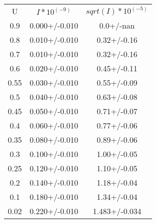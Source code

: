 \begin{table}
\begin{tabular}{ccc}
U & $I*10^(-9)$ & $sqrt(I)*10^(-5)$ \\
0.9 & 0.000+/-0.010 & 0.0+/-nan \\
0.8 & 0.010+/-0.010 & 0.32+/-0.16 \\
0.7 & 0.010+/-0.010 & 0.32+/-0.16 \\
0.6 & 0.020+/-0.010 & 0.45+/-0.11 \\
0.55 & 0.030+/-0.010 & 0.55+/-0.09 \\
0.5 & 0.040+/-0.010 & 0.63+/-0.08 \\
0.45 & 0.050+/-0.010 & 0.71+/-0.07 \\
0.4 & 0.060+/-0.010 & 0.77+/-0.06 \\
0.35 & 0.080+/-0.010 & 0.89+/-0.06 \\
0.3 & 0.100+/-0.010 & 1.00+/-0.05 \\
0.25 & 0.120+/-0.010 & 1.10+/-0.05 \\
0.2 & 0.140+/-0.010 & 1.18+/-0.04 \\
0.1 & 0.180+/-0.010 & 1.34+/-0.04 \\
0.02 & 0.220+/-0.010 & 1.483+/-0.034 \\
\end{tabular}
\end{table}

